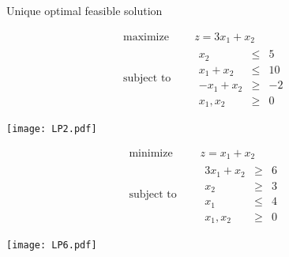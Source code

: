 \documentclass[c]{beamer}
\begin{document}
\begin{frame}[allowframebreaks]{Unique optimal feasible solution}
  \begin{Exercise}
    \begin{equation*}
      \begin{aligned}
        \text{maximize } \quad & z = 3x_1 + x_2 \\
        \text{subject to }\quad &
        \begin{array}{rcl}
          x_2 & \leq & 5\\
          x_1 + x_2 &\leq& 10\\
          -x_1+x_2 &\geq& -2\\
          x_1,x_2 &\geq &0
        \end{array}
      \end{aligned}
    \end{equation*}
  \end{Exercise}
  \framebreak
  \begin{center}
    \texttt{[image: LP2.pdf]}
  \end{center}
 \framebreak
  \begin{Exercise}
    \begin{equation*}
      \begin{aligned}
        \text{minimize } \quad & z = x_1 + x_2 \\
        \text{subject to }\quad &
        \begin{array}{rcl}
          3x_1 + x_2 & \geq & 6\\
          x_2 &\geq& 3\\
          x_1 &\leq& 4\\
          x_1,x_2 &\geq &0
        \end{array}
      \end{aligned}
    \end{equation*}
  \end{Exercise}

 \framebreak
  \begin{center}
    \texttt{[image: LP6.pdf]}
  \end{center}

\end{frame}
\end{document}
